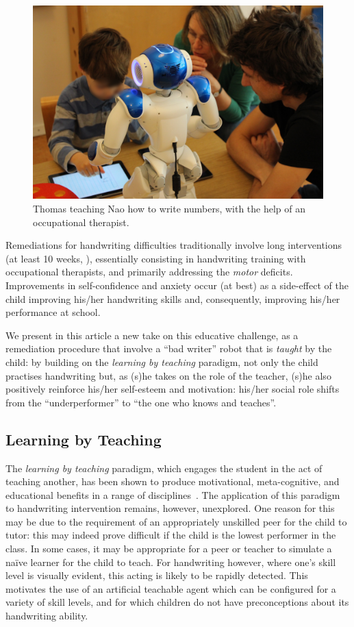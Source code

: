 \documentclass{article}
\begin{document}
\begin{figure}
    \centering
    \includegraphics[width=0.9\linewidth]{henry}
    \caption{\small Thomas teaching Nao how to write numbers, with the help of an
    occupational therapist.}
    \label{fig:henry}
\end{figure}

Remediations for handwriting difficulties traditionally involve long
interventions (at least 10 weeks, \cite{Hoy2011}), essentially consisting in
handwriting training with occupational therapists, and primarily addressing the
\emph{motor} deficits.  Improvements in self-confidence and anxiety occur (at
best) as a side-effect of the child improving his/her handwriting skills and,
consequently, improving his/her performance at school.

We present in this article a new take on this educative challenge, as a
remediation procedure that involve a ``bad writer'' robot that is \emph{taught}
by the child: by building on the \emph{learning by teaching} paradigm, not only
the child practises handwriting but, as (s)he takes on the role of the teacher,
(s)he also positively reinforce his/her self-esteem and motivation: his/her
social role shifts from the ``underperformer'' to ``the one who knows and
teaches''.

\subsection{Learning by Teaching}

The \emph{learning by teaching} paradigm, which engages the student in the act
of teaching another, has been shown to produce motivational, meta-cognitive, and
educational benefits in a range of disciplines~\cite{Rohrbeck2003}.  The
application of this paradigm to handwriting intervention remains, however,
unexplored. One reason for this may be due to the requirement of an
appropriately unskilled peer for the child to tutor: this may indeed prove
difficult if the child is the lowest performer in the class.  In some cases, it
may be appropriate for a peer or teacher to simulate a na\"ive learner for the
child to teach. For handwriting however, where one's skill level is visually
evident, this acting is likely to be rapidly detected. This motivates the use of
an artificial teachable agent which can be configured for a variety of skill
levels, and for which children do not have preconceptions about its handwriting
ability.
\end{document}
